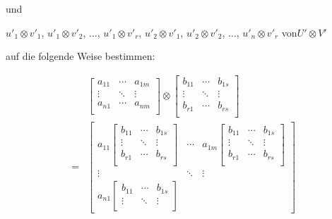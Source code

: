 \vspace{0.2cm}
\hspace{5cm}und 

\vspace{0.2cm}
\hspace{1cm}$u'_1\otimes v'_1$, $u'_1\otimes v'_2$, $\ldots$, $u'_1\otimes v'_r$, $u'_2\otimes v'_1$, $u'_2\otimes v'_2$, $\ldots$, $u'_n\otimes v'_r$ \quad von\quad $U'\otimes V'$

\vspace{0.2cm}
auf die folgende Weise bestimmen:

\begin{align*}
    &\begin{bmatrix}
        a_{11} & \cdots & a_{1m} \\
        \vdots & \ddots  & \vdots \\
        a_{n1} & \cdots  & a_{nm} \\
    \end{bmatrix}
    \otimes
    \begin{bmatrix}
        b_{11} & \cdots & b_{1s} \\
        \vdots & \ddots  & \vdots \\
        b_{r1} & \cdots  & b_{rs} \\
    \end{bmatrix} \\[0.5cm]
    =
    &\begin{bmatrix}
        a_{11}\begin{bmatrix}
            b_{11} & \cdots & b_{1s} \\
            \vdots & \ddots  & \vdots \\
            b_{r1} & \cdots  & b_{rs} \\
        \end{bmatrix} 
        & \cdots & a_{1m}\begin{bmatrix}
            b_{11} & \cdots & b_{1s} \\
            \vdots & \ddots  & \vdots \\
            b_{r1} & \cdots  & b_{rs} \\
        \end{bmatrix}
         \\
        \vdots & \ddots  & \vdots \\
        a_{n1}\begin{bmatrix}
            b_{11} & \cdots & b_{1s} \\
            \vdots & \ddots  & \vdots \\

\end{bmatrix}
\end{bmatrix}
\end{align*}
